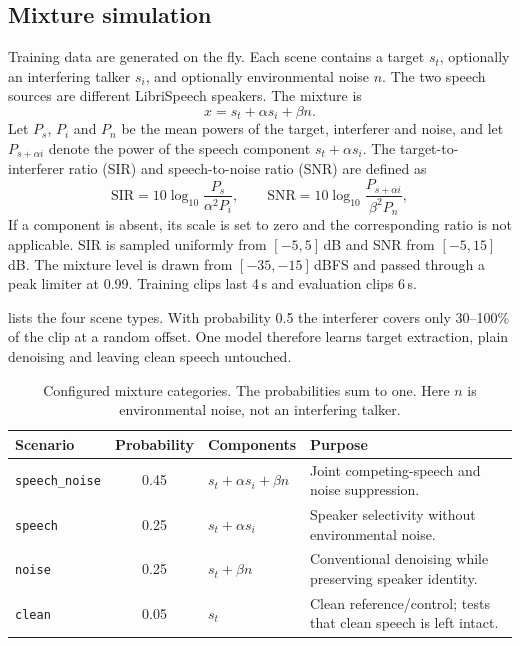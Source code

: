 \documentclass[11pt,a4paper]{article}
\begin{document}
\subsection{Mixture simulation}
\label{sec:mixture}
Training data are generated on the fly. Each scene contains a target $s_t$, optionally an
interfering talker $s_i$, and optionally environmental noise $n$. The two speech sources are
different LibriSpeech speakers. The mixture is
\begin{equation}
  x=s_t+\alpha s_i+\beta n .
  \label{eq:mixture}
\end{equation}
Let $P_s$, $P_i$ and $P_n$ be the mean powers of the target, interferer and noise, and let
$P_{s+\alpha i}$ denote the power of the speech component $s_t+\alpha s_i$. The target-to-
interferer ratio (SIR) and speech-to-noise ratio (SNR) are defined as
\begin{equation}
  \mathrm{SIR}=10\log_{10}\frac{P_s}{\alpha^2P_i},
  \qquad
  \mathrm{SNR}=10\log_{10}\frac{P_{s+\alpha i}}{\beta^2P_n},
\end{equation}
If a component is absent, its scale is set to zero and the corresponding ratio is not applicable.
SIR is sampled uniformly from
$[-5,5]$\,dB and SNR from $[-5,15]$\,dB. The mixture level is drawn from $[-35,-15]$\,dBFS and
passed through a peak limiter at 0.99. Training clips last 4\,s and evaluation clips 6\,s.

 lists the four scene types. With probability 0.5 the interferer covers only
30--100\% of the clip at a random offset. One model therefore learns target extraction, plain
denoising and leaving clean speech untouched.

\begin{table}[htbp]
\centering\footnotesize
\caption{Configured mixture categories. The probabilities sum to one. Here $n$ is environmental
noise, not an interfering talker.}
\label{tab:scenarios}
\begin{tabularx}{\textwidth}{@{}l c l Y@{}}
\toprule
\textbf{Scenario} & \textbf{Probability} & \textbf{Components} & \textbf{Purpose}\\
\midrule
\texttt{speech\_noise} & 0.45 & $s_t+\alpha s_i+\beta n$ &
  Joint competing-speech and noise suppression.\\
\texttt{speech} & 0.25 & $s_t+\alpha s_i$ &
  Speaker selectivity without environmental noise.\\
\texttt{noise} & 0.25 & $s_t+\beta n$ &
  Conventional denoising while preserving speaker identity.\\
\texttt{clean} & 0.05 & $s_t$ &
  Clean reference/control; tests that clean speech is left intact.\\
\bottomrule
\end{tabularx}
\end{table}
\end{document}
